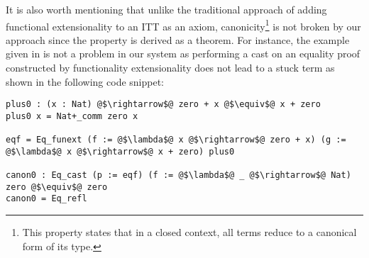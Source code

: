 \documentclass[12pt,twoside,maitrise]{dms}
\theoremstyle{definition}
\numberwithin{equation}{section}
\numberwithin{table}{chapter}
\numberwithin{figure}{chapter}
\newcommand\id[1] {\texttt{#1}}
\begin{document}



It is also worth mentioning that unlike the traditional approach of adding
functional extensionality to an ITT as an axiom, canonicity\footnote{This
property states that in a closed context, all terms reduce to a canonical form
of its type.} is not broken by our approach since the property is derived as a
theorem. For instance, the example given in\cite{altenkirch2007observational} is
not a problem in our system as performing a cast on an equality proof
constructed by functionality extensionality does not lead to a stuck term as
shown in the following code snippet:

\begin{verbatim}
plus0 : (x : Nat) @$\rightarrow$@ zero + x @$\equiv$@ x + zero
plus0 x = Nat+_comm zero x

eqf = Eq_funext (f := @$\lambda$@ x @$\rightarrow$@ zero + x) (g := @$\lambda$@ x @$\rightarrow$@ x + zero) plus0

canon0 : Eq_cast (p := eqf) (f := @$\lambda$@ _ @$\rightarrow$@ Nat) zero @$\equiv$@ zero
canon0 = Eq_refl
\end{verbatim}
\end{document}
